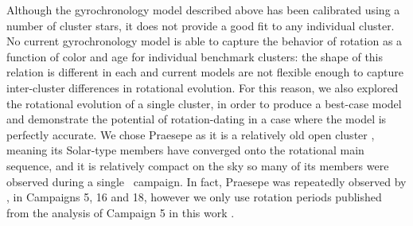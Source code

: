 Although the gyrochronology model described above \citep[equation
\ref{eqn:gyro},][]{angus2015} has been calibrated using a number of cluster
stars, it does not provide a good fit to any individual cluster.
No current gyrochronology model is able to capture the behavior of rotation as
a function of color and age for individual benchmark clusters: the shape of
this relation is different in each and current models are not flexible enough
to capture inter-cluster differences in rotational evolution.
For this reason, we also explored the rotational evolution of a single
cluster, in order to produce a best-case model and demonstrate the potential
of rotation-dating in a case where the model is perfectly accurate.
We chose Praesepe as it is a relatively old open cluster \citep[$\sim$ 600
Myrs][]{gossage2018}, meaning its Solar-type members have converged onto the
rotational main sequence, and it is relatively compact on the sky so many of
its members were observed during a single \ktwo\ campaign.
In fact, Praesepe was repeatedly observed by \ktwo, in Campaigns 5, 16 and 18,
however we only use rotation periods published from the analysis of Campaign 5
in this work \citep{rebull2016}.

